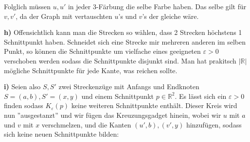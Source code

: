 \documentclass[a4paper,graphics,11pt]{article}
\newcommand{\eps}[0]{\varepsilon}
\begin{document}
Folglich müssen $u,u'$ in jeder 3-Färbung die selbe Farbe haben. Das selbe gilt für $v,v'$, da der Graph
mit vertauschten $u$'s und $v$'s der gleiche wäre.

\textbf{h)}
Offensichtlich kann man die Strecken so wählen, dass 2 Strecken höchstens 1 Schnittpunkt haben.
Schneidet sich eine Strecke mir mehreren anderen im selben Punkt, so können die Schnittpunkte um
vielfache eines geeigneten $\eps > 0$ verschoben werden sodass die Schnittpunkte disjunkt sind.
Man hat prakitsch $|\mathbb{R}|$ mögliche Schnittpunkte für jede Kante, was reichen sollte.

\textbf{i)}
Seien also $S,S'$ zwei Streckenzüge mit Anfangs und Endknoten $S=(a,b), S'=(x,y)$ und einem Schnittpunkt $p \in \mathbb{R}^2$. Es lässt sich ein $\eps > 0$
finden sodass $K_\eps(p)$ keine weiteren Schnittpunkte enthält. Dieser Kreis wird nun ''ausgestanzt'' und wir fügen
das Kreuzungsgadget hinein, wobei wir $u$ mit $a$ und $v$ mit $x$ verschmelzen, und die Kanten $(u',b),(v',y)$
hinzufügen, sodass sich keine neuen Schnittpunkte bilden:
\end{document}

